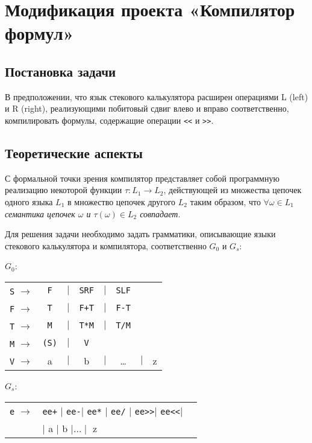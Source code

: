 
\section{Модификация проекта «Компилятор формул»}
\subsection{Постановка задачи}
В предположении, что язык стекового калькулятора
расширен операциями L (left) и R (right),
реализующими побитовый сдвиг влево и вправо соответственно, компилировать
формулы, содержащие операции \verb|<<| и \verb|>>|.

\subsection{Теоретические аспекты}
С формальной точки зрения компилятор представляет собой программную реализацию
некоторой функции $\tau\colon L_1 \rightarrow L_2$, действующей из множества
цепочек одного языка $L_1$ в множество цепочек другого $L_2$ таким образом, что
$\forall \omega \in L_1$ {\em семантика цепочек $\omega$ и $\tau(\omega)\in L_2$
 совпадает.}

Для решения задачи необходимо задать грамматики, описывающие языки стекового
калькулятора и компилятора, соответственно $G_0$ и $G_s$:

$G_0$:
\medskip
\noindent\hspace{2cm}
\begin{tabular}{rcccccll}
\verb|S| $\rightarrow$ & \verb|F| &$\mid$& \verb|SRF|&$\mid$&\verb|SLF|\\
\verb|F| $\rightarrow$ & \verb|T| &$\mid$& \verb|F+T|&$\mid$&\verb|F-T|\\
\verb|T| $\rightarrow$ & \verb|M| &$\mid$& \verb|T*M|&$\mid$&\verb|T/M|\\
\verb|M| $\rightarrow$ & \verb|(S)|&$\mid$& \verb|V|\\
\verb|V| $\rightarrow$ & a &$\mid$& b &$\mid$& \dots &$\mid$& z\\
\end{tabular}
\medskip

$G_s$:
\medskip
\noindent\hspace{2cm}
\begin{tabular}{rll}
\verb|e| $\rightarrow$ & \verb|ee+| $\mid$ \verb|ee-|$\mid$ \verb|ee*| $\mid$ \verb|ee/| $\mid$ \verb|ee>>|$\mid$ \verb|ee<<|$\mid$\\
&$\mid$ a $\mid$ b $\mid \dots \mid$ z
\end{tabular}

